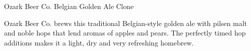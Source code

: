 \begin{recipie}{Ozark Beer Co. Belgian Golden Ale Clone}

\begin{aboutblock}
Ozark Beer Co. brews this traditional Belgian-style golden ale with pilsen malt
and noble hops that lend aromas of apples and pears. The perfectly timed hop
additions makes it a light, dry and very refreshing homebrew. \sourceaha
\end{aboutblock}


\begin{methodandtiming}
 
\begin{mashsteps}
\end{mashsteps}

\begin{fermentationsteps}
\end{fermentationsteps}

\end{methodandtiming}

\pagebreak

\begin{ingredientsblock}

\begin{malts}
\end{malts}

\begin{hops}
\end{hops}


\end{ingredientsblock}

\end{recipie}